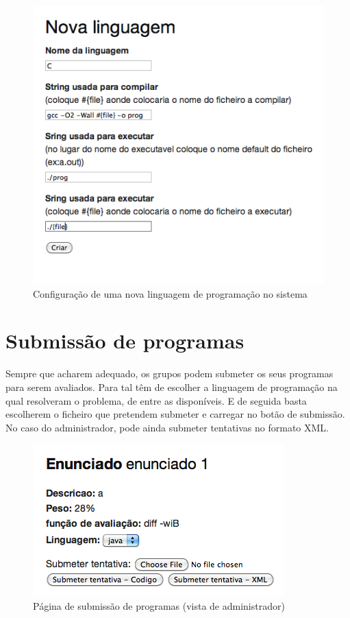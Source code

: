 \begin{itemize}
\begin{figure}[H]
\begin{center}
\includegraphics[scale=0.60]{Images/newLang}
\caption{Configuração de uma nova linguagem de programação no sistema}\label{img:newLang}
\end{center}
\end{figure} 

\end{itemize}

\section{Submissão de programas}\label{sec subm}
Sempre que acharem adequado, os grupos podem submeter os seus programas para serem avaliados. Para tal têm de escolher a linguagem de programação na qual resolveram o problema, de entre as disponíveis. E de seguida basta escolherem o ficheiro que pretendem submeter e carregar no botão de submissão.\\
No caso do administrador, pode ainda submeter tentativas no formato XML.

\begin{figure}[H]
\begin{center}
\includegraphics[scale=0.60]{Images/submissao}
\caption{Página de submissão de programas (vista de administrador)}\label{img:subm}
\end{center}
\end{figure} 

